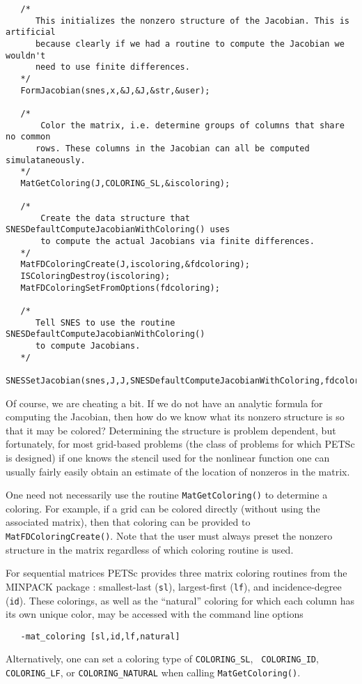 {\begin{verbatim}
   /* 
      This initializes the nonzero structure of the Jacobian. This is artificial
      because clearly if we had a routine to compute the Jacobian we wouldn't
      need to use finite differences.
   */
   FormJacobian(snes,x,&J,&J,&str,&user);

   /*
       Color the matrix, i.e. determine groups of columns that share no common 
      rows. These columns in the Jacobian can all be computed simulataneously.
   */
   MatGetColoring(J,COLORING_SL,&iscoloring);

   /*
       Create the data structure that SNESDefaultComputeJacobianWithColoring() uses
       to compute the actual Jacobians via finite differences.
   */
   MatFDColoringCreate(J,iscoloring,&fdcoloring);
   ISColoringDestroy(iscoloring);
   MatFDColoringSetFromOptions(fdcoloring);

   /*
      Tell SNES to use the routine SNESDefaultComputeJacobianWithColoring()
      to compute Jacobians.
   */
   SNESSetJacobian(snes,J,J,SNESDefaultComputeJacobianWithColoring,fdcoloring);

\end{verbatim}

  
 

Of course, we are cheating a bit. If we do not have an analytic
formula for computing the Jacobian, then how do we know what its
nonzero structure is so that it may be colored?  Determining the
structure is problem dependent, but fortunately, for most grid-based
problems (the class of problems for which PETSc is designed) if one
knows the stencil used for the nonlinear function one can usually
fairly easily obtain an estimate of the location of nonzeros in
the matrix.

One need not necessarily use the routine {\tt MatGetColoring()} to
determine a coloring.  For example, if a grid can be colored directly
(without using the associated matrix), then that coloring can be provided
to {\tt MatFDColoringCreate()}.  Note that the user must always
preset the nonzero structure in the matrix regardless of which
coloring routine is used.

For sequential matrices PETSc provides three matrix coloring routines from the 
MINPACK package \cite{more84}: smallest-last ({\tt sl}), largest-first ({\tt lf}),
and incidence-degree ({\tt id}).  These colorings, as well as the ``natural'' coloring 
for which each column has its own unique color, may be accessed with the command line options
\begin{verbatim}
   -mat_coloring [sl,id,lf,natural]
\end{verbatim}
Alternatively, one can set a coloring type of {\tt COLORING\_SL}, {\tt
COLORING\_ID}, {\tt COLORING\_LF}, or {\tt COLORING\_NATURAL} 
when calling {\tt MatGetColoring()}.   
 

}

